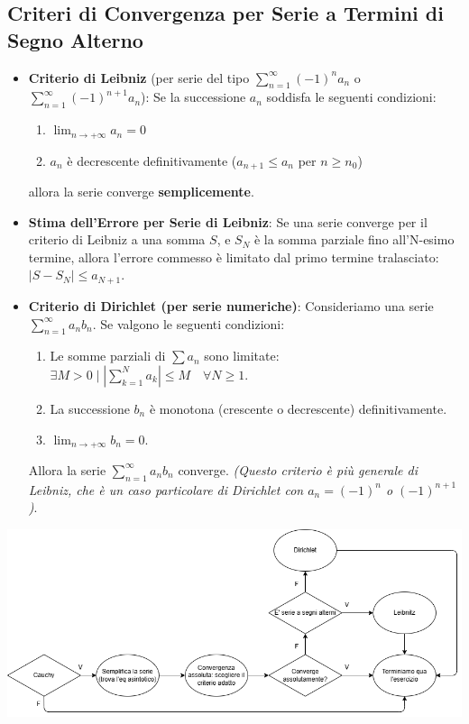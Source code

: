 \documentclass[10pt, a4paper]{article}
\begin{document}
    \subsection{Criteri di Convergenza per Serie a Termini di Segno Alterno}
        \begin{itemize}
            \item \textbf{Criterio di Leibniz} (per serie del tipo $\sum_{n=1}^{\infty}(-1)^n a_n$ o $\sum_{n=1}^{\infty}(-1)^{n+1} a_n$):
            Se la successione $a_n$ soddisfa le seguenti condizioni:
            \begin{enumerate}
                \item $\lim_{n\rightarrow+\infty}a_n=0$
                \item $a_n$ è decrescente definitivamente ($a_{n+1} \leq a_n$ per $n \geq n_0$)
            \end{enumerate}
            allora la serie converge \textbf{semplicemente}.

            \item \textbf{Stima dell'Errore per Serie di Leibniz}:
            Se una serie converge per il criterio di Leibniz a una somma $S$, e $S_N$ è la somma parziale fino all'N-esimo termine, allora l'errore commesso è limitato dal primo termine tralasciato:
            $\left|S - S_N\right| \leq a_{N+1}$.

            \item \textbf{Criterio di Dirichlet (per serie numeriche)}:
            Consideriamo una serie $\sum_{n=1}^{\infty}a_nb_n$. Se valgono le seguenti condizioni:
            \begin{enumerate}
                \item Le somme parziali di $\sum a_n$ sono limitate: $\exists M>0 \mid \left|\sum_{k=1}^{N}a_k\right|\leq M \quad \forall N\geq 1$.
                \item La successione $b_n$ è monotona (crescente o decrescente) definitivamente.
                \item $\lim_{n\rightarrow+\infty}b_n=0$.
            \end{enumerate}
            Allora la serie $\sum_{n=1}^{\infty}a_nb_n$ converge.
            \textit{(Questo criterio è più generale di Leibniz, che è un caso particolare di Dirichlet con $a_n = (-1)^n$ o $(-1)^{n+1}$)}.
        \end{itemize}
    \begin{center}
        \includegraphics[width=.8\textwidth]{Images/convergenzaflowchart.png}
    \end{center}
\end{document}

